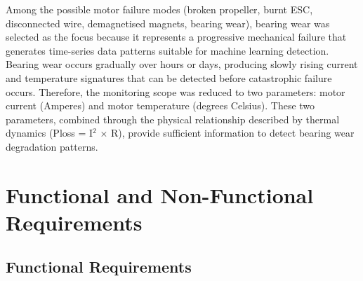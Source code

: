 Among the possible motor failure modes (broken propeller, burnt ESC, disconnected wire, demagnetised magnets, bearing wear), bearing wear was selected as the focus because it represents a progressive mechanical failure that generates time-series data patterns suitable for machine learning detection. Bearing wear occurs gradually over hours or days, producing slowly rising current and temperature signatures that can be detected before catastrophic failure occurs. Therefore, the monitoring scope was reduced to two parameters: motor current (Amperes) and motor temperature (degrees Celsius). These two parameters, combined through the physical relationship described by thermal dynamics (Ploss = I$^2$ × R), provide sufficient information to detect bearing wear degradation patterns.

\section{Functional and Non-Functional Requirements}

\subsection{Functional Requirements}

